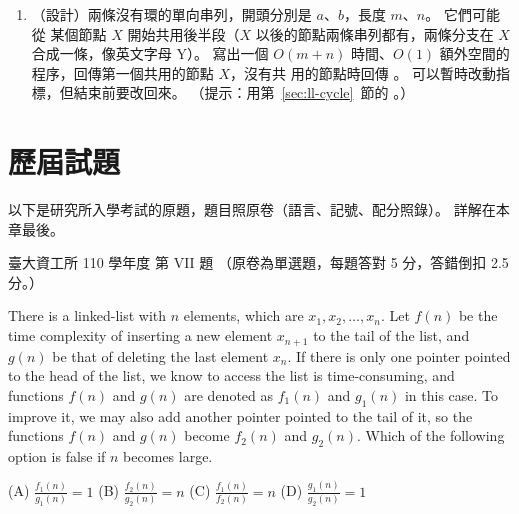 \begin{enumerate}
\item （設計）兩條沒有環的單向串列，開頭分別是 $a$、$b$，長度 $m$、$n$。 它們可能從
某個節點 $X$ 開始共用後半段（$X$ 以後的節點兩條串列都有，兩條分支在 $X$ 合成一條，像英文字母 Y）。
寫出一個 $O(m + n)$ 時間、$O(1)$ 額外空間的程序，回傳第一個共用的節點 $X$，沒有共
用的節點時回傳 \NIL。 可以暫時改動指標，但結束前要改回來。 （提示：用第~\ref{sec:ll-cycle}~節的
。）
\end{enumerate}

\section{歷屆試題}
\label{sec:ll-pastexam}

以下是研究所入學考試的原題，題目照原卷（語言、記號、配分照錄）。 詳解在本章最後。

\begin{pastexam}[label={px:ll-1}]{臺大資工所 110 學年度 第 VII 題}
（原卷為單選題，每題答對 5 分，答錯倒扣 2.5 分。）

There is a linked-list with $n$ elements, which are $x_1,x_2,\ldots,x_n$. Let $f(n)$ be
the time complexity of inserting a new element $x_{n+1}$ to the tail of the list, and
$g(n)$ be that of deleting the last element $x_n$. If there is only one pointer pointed
to the head of the list, we know to access the list is time-consuming, and functions
$f(n)$ and $g(n)$ are denoted as $f_1(n)$ and $g_1(n)$ in this case. To improve it, we
may also add another pointer pointed to the tail of it, so the functions $f(n)$ and
$g(n)$ become $f_2(n)$ and $g_2(n)$. Which of the following option is false if $n$
becomes large. \underline{}

(A) $\frac{f_1(n)}{g_1(n)}=1$ \qquad (B) $\frac{f_2(n)}{g_2(n)}=n$ \qquad
(C) $\frac{f_1(n)}{f_2(n)}=n$ \qquad (D) $\frac{g_1(n)}{g_2(n)}=1$
\end{pastexam}

